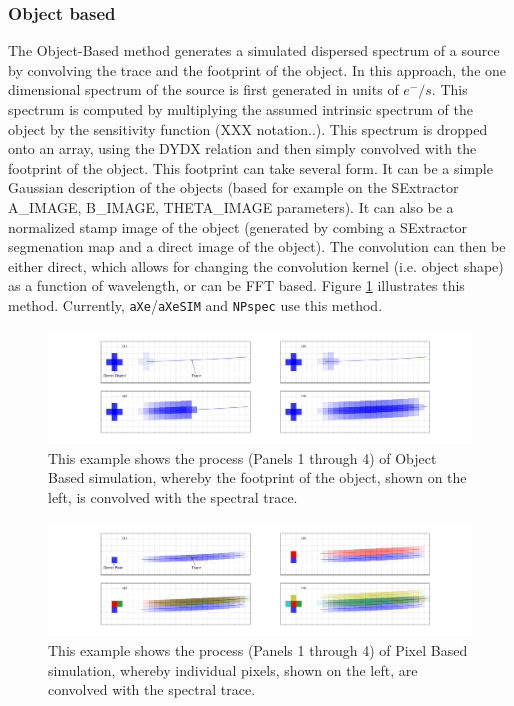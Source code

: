 \documentclass[preprint]{aastex}
\begin{document}
\subsubsection{Object based}

The Object-Based method generates a simulated dispersed spectrum of a source by convolving the trace and the footprint of the object. In this approach, the one dimensional spectrum of the source is first generated in units of $e^-/s$. This spectrum is computed by multiplying the assumed intrinsic spectrum of the object by the sensitivity function (XXX notation..). This spectrum is dropped onto an array, using the DYDX relation and then simply convolved with the footprint of the object. This footprint can take several form. It can be a simple Gaussian description of the objects (based for example on the SExtractor A\_IMAGE, B\_IMAGE, THETA\_IMAGE parameters). It can also be a normalized stamp image of the object (generated by combing a SExtractor segmenation map and a direct image of the object). The convolution can then be either direct, which allows for changing the convolution kernel (i.e. object shape) as a function of wavelength, or can be FFT based.
Figure \ref{sim:1} illustrates this method. Currently, \texttt{aXe}/\texttt{aXeSIM} and \texttt{NPspec} use this method. 


\begin{figure}[!t]
\centering
\includegraphics[width=\textwidth]{"Figures/object_sim"}
\caption{This example shows the process (Panels 1 through 4) of Object Based simulation, whereby the footprint of the object, shown on the left, is convolved with the spectral trace.}
\label{sim:1}
\end{figure}

\begin{figure}[!t]
\centering
\includegraphics[width=\textwidth]{"Figures/pixel_sim"}
\caption{This example shows the process (Panels 1 through 4) of Pixel Based simulation, whereby individual pixels, shown on the left, are convolved with the spectral trace.}
\label{sim:2}
\end{figure}
\end{document}
